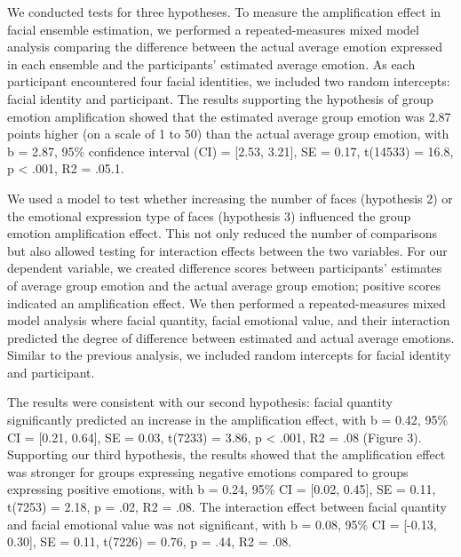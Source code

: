 \documentclass[
  man]{apa6}
\begin{document}
We conducted tests for three hypotheses. To measure the amplification effect in facial ensemble estimation, we performed a repeated-measures mixed model analysis comparing the difference between the actual average emotion expressed in each ensemble and the participants' estimated average emotion. As each participant encountered four facial identities, we included two random intercepts: facial identity and participant. The results supporting the hypothesis of group emotion amplification showed that the estimated average group emotion was 2.87 points higher (on a scale of 1 to 50) than the actual average group emotion, with b = 2.87, 95\% confidence interval (CI) = {[}2.53, 3.21{]}, SE = 0.17, t(14533) = 16.8, p \textless{} .001, R2 = .05.1.

We used a model to test whether increasing the number of faces (hypothesis 2) or the emotional expression type of faces (hypothesis 3) influenced the group emotion amplification effect. This not only reduced the number of comparisons but also allowed testing for interaction effects between the two variables. For our dependent variable, we created difference scores between participants' estimates of average group emotion and the actual average group emotion; positive scores indicated an amplification effect. We then performed a repeated-measures mixed model analysis where facial quantity, facial emotional value, and their interaction predicted the degree of difference between estimated and actual average emotions. Similar to the previous analysis, we included random intercepts for facial identity and participant.

The results were consistent with our second hypothesis: facial quantity significantly predicted an increase in the amplification effect, with b = 0.42, 95\% CI = {[}0.21, 0.64{]}, SE = 0.03, t(7233) = 3.86, p \textless{} .001, R2 = .08 (Figure 3). Supporting our third hypothesis, the results showed that the amplification effect was stronger for groups expressing negative emotions compared to groups expressing positive emotions, with b = 0.24, 95\% CI = {[}0.02, 0.45{]}, SE = 0.11, t(7253) = 2.18, p = .02, R2 = .08. The interaction effect between facial quantity and facial emotional value was not significant, with b = 0.08, 95\% CI = {[}-0.13, 0.30{]}, SE = 0.11, t(7226) = 0.76, p = .44, R2 = .08.
\end{document}
